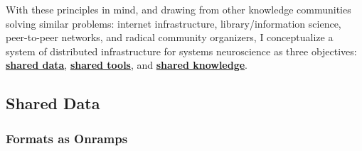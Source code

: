 \documentclass[10pt]{article}
\begin{document}
\begin{multicols}{2}
With these principles in mind, and drawing from other knowledge
communities solving similar problems: internet infrastructure,
library/information science, peer-to-peer networks, and radical
community organizers, I conceptualize a system of distributed
infrastructure for systems neuroscience as three objectives:
\protect\hyperlink{shared-data}{\textbf{shared data}},
\protect\hyperlink{shared-tools}{\textbf{shared tools}}, and
\protect\hyperlink{shared-knowledge}{\textbf{shared knowledge}}.

\end{multicols}


\hypertarget{shared-data}{%
\subsection{Shared Data}\label{shared-data}}

\hypertarget{formats-as-onramps}{%
\subsubsection{Formats as Onramps}\label{formats-as-onramps}}
\end{document}
